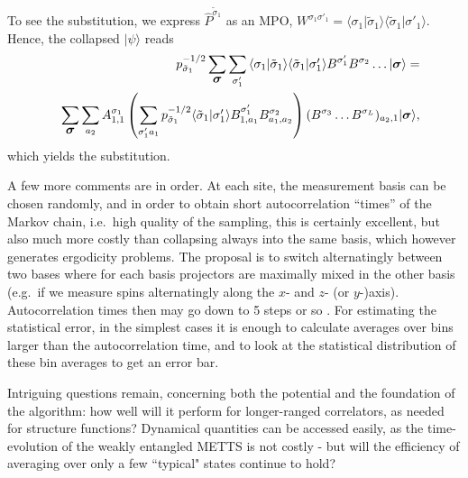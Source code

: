\documentclass[a4paper,10pt,oneside,onecolumn,1p,times]{elsarticle}
\newcommand{\ket}[1]{\mbox{$| #1  \rangle$}}
\newcommand{\braket}[2]{\mbox{$\langle #1  | #2 \rangle$}} 	%
\newcommand{\fat}[1]{\mbox{\boldmath$#1$\unboldmath}}	%
\begin{document}
To see the substitution, we express $\hat{P}^{\tilde{\sigma}_1}$ as an MPO, $W^{\sigma_1 \sigma'_1} = \braket{\sigma_1}{\tilde{\sigma}_1} \braket{\tilde{\sigma}_1}{\sigma'_1}$. Hence, the collapsed $\ket{\psi}$ reads
\begin{eqnarray*}
& & p_{\tilde{\sigma}_1}^{-1/2} \sum_{\fat{\sigma}} \sum_{\sigma'_1} \braket{\sigma_1}{\tilde{\sigma}_1} \braket{\tilde{\sigma}_1}{\sigma'_1} B^{\sigma'_1} B^{\sigma_2} \ldots \ket{\fat{\sigma}} = \\
& & \sum_{\fat{\sigma}} \sum_{a_2} A^{\sigma_1}_{1,1} \left( \sum_{\sigma'_1 a_1}  p_{\tilde{\sigma}_1}^{-1/2}  \braket{\tilde{\sigma}_1}{\sigma'_1} B^{\sigma'_1}_{1,a_1} B^{\sigma_2}_{a_1,a_2} \right) (B^{\sigma_3} \ldots B^{\sigma_L})_{a_2,1} \ket{\fat{\sigma}} ,
\end{eqnarray*}
which yields the substitution.

A few more comments are in order. At each site, the measurement basis can be chosen randomly, and in order to obtain short autocorrelation ``times'' of the Markov chain, i.e.\ high quality of the sampling, this is certainly excellent, but also much more costly than collapsing always into the same basis, which however generates ergodicity problems. The proposal is to switch alternatingly between two bases where for each basis projectors are maximally mixed in the other basis (e.g.\ if we measure spins alternatingly along the $x$- and $z$- (or $y$-)axis). Autocorrelation times then may go down to 5 steps or so \cite{Stoudenmire10}. For estimating the statistical error, in the simplest cases it is enough to calculate averages over bins larger than the autocorrelation time, and to look at the statistical distribution of these bin averages to get an error bar. 

Intriguing questions remain, concerning both the potential and the foundation of the algorithm: how well will it perform for longer-ranged correlators, as needed for structure functions? Dynamical quantities can be accessed easily, as the time-evolution of the weakly entangled METTS is not costly - but will the efficiency of averaging over only a few ``typical" states continue to hold? 
\end{document}
